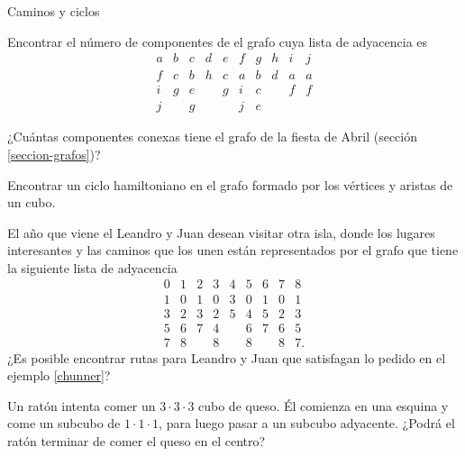 \begin{section}{Caminos y ciclos}
\begin{enumex}
\item Encontrar el número de componentes de el grafo cuya lista de adyacencia es
$$
\begin{matrix}
a&b&c&d&e&f&g&h&i&j\\ \hline
f&c&b&h&c&a&b&d&a&a\\
i&g&e&&g&i&c&&f&f\\
j&&g&&&j&e&&&
\end{matrix}
$$

\item ¿Cuántas componentes conexas tiene el grafo de la fiesta de Abril (sección \ref{seccion-grafos})?
\item Encontrar un ciclo hamiltoniano en el grafo formado por los vértices y aristas de un
cubo.
\item El año que viene el Leandro y Juan desean visitar otra isla, donde los lugares interesantes y las caminos que los unen están representados por el grafo que tiene la siguiente lista de adyacencia
$$
\begin{matrix}
0&1&2&3&4&5&6&7&8\\ \hline
1&0&1&0&3&0&1&0&1\\
3&2&3&2&5&4&5&2&3\\
5&6&7&4&&6&7&6&5\\
7&8&&8&&8&&8&7.
\end{matrix}
$$
¿Es posible encontrar rutas para Leandro y Juan que satisfagan lo pedido en el ejemplo \ref{chunner}?
\item Un ratón intenta comer un $3\cdot 3\cdot 3$ cubo de queso. Él comienza en una esquina y come un subcubo de $1\cdot 1\cdot 1$, para luego pasar a un subcubo  adyacente. ¿Podrá el ratón terminar de comer el queso en el centro?
\end{enumex}

\end{section}




